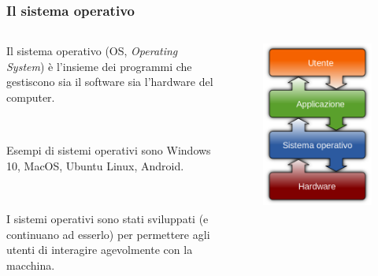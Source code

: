 \documentclass[]{beamer}
\begin{document}
\begin{frame}
\frametitle{Il sistema operativo}
\begin{columns}
  \begin{column}{.65\textwidth}
    Il sistema operativo (OS, \emph{Operating System}) è l'\alert<1>{insieme dei programmi che gestiscono sia il software sia l'hardware del computer}.\pause

    ~
    
    Esempi di sistemi operativi sono Windows 10, MacOS, Ubuntu Linux, Android.\pause
    
    ~
    
    I sistemi operativi sono stati sviluppati (e continuano ad esserlo) per permettere agli utenti di \alert<3>{interagire agevolmente con la macchina}.
  \end{column}
  \begin{column}{.3\textwidth}
      \begin{figure}
        \includegraphics[width=\columnwidth]{img/sistemaoperativo.png}
      \end{figure}
  \end{column}
\end{columns}
\end{frame}
\end{document}
